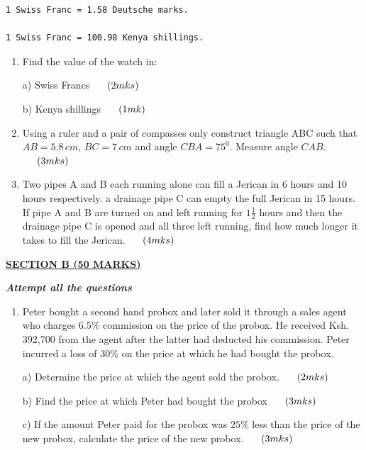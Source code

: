 \documentclass[
  a4paperpaper,
]{scrbook}
\begin{document}
\begin{tcolorbox}
\begin{verbatim}
1 Swiss Franc = 1.58 Deutsche marks.

1 Swiss Franc = 100.98 Kenya shillings.
\end{verbatim}

\begin{enumerate}
\def\labelenumi{\arabic{enumi}.}
\setcounter{enumi}{14}
\item
  Find the value of the watch in:

  a) Swiss Francs \(\hspace{0.5cm} (2mks)\)

  b) Kenya shillings \(\hspace{0.5cm} (1mk)\)
\item
  Using a ruler and a pair of compasses only construct triangle ABC such
  that \(AB= 5.8\,cm\), \(BC = 7\,cm\) and angle \(CBA = 75^0\). Measure
  angle \(CAB\). \(\hspace{0.5cm} (3mks)\)
\item
  Two pipes A and B each running alone can fill a Jerican in 6 hours and
  10 hours respectively. a drainage pipe C can empty the full Jerican in
  15 hours. If pipe A and B are turned on and left running for
  \(1\frac{1}{2}\) hours and then the drainage pipe C is opened and all
  three left running, find how much longer it takes to fill the Jerican.
  \(\hspace{0.5cm} (4mks)\)
\end{enumerate}

\ul{\textbf{SECTION B (50 MARKS)}}

\textbf{\emph{Attempt all the questions}}

\begin{enumerate}
\def\labelenumi{\arabic{enumi}.}
\setcounter{enumi}{17}
\item
  Peter bought a second hand probox and later sold it through a sales
  agent who charges \(6.5\%\) commission on the price of the probox. He
  received Ksh. 392,700 from the agent after the latter had deducted his
  commission. Peter incurred a loss of \(30\%\) on the price at which he
  had bought the probox.

  a) Determine the price at which the agent sold the probox.
  \(\hspace{0.5cm}(2mks)\)

  b) Find the price at which Peter had bought the probox
  \(\hspace{0.5cm} (3mks)\)

  c) If the amount Peter paid for the probox was \(25\%\) less than the
  price of the new probox, calculate the price of the new probox.
  \(\hspace{0.5cm} (3mks)\)


\end{enumerate}
\end{tcolorbox}
\end{document}
